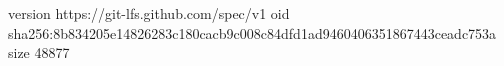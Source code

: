 version https://git-lfs.github.com/spec/v1
oid sha256:8b834205e14826283c180cacb9c008c84dfd1ad9460406351867443ceadc753a
size 48877
